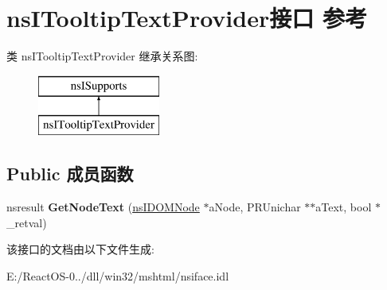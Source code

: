 \hypertarget{interfacens_i_tooltip_text_provider}{}\section{ns\+I\+Tooltip\+Text\+Provider接口 参考}
\label{interfacens_i_tooltip_text_provider}
类 ns\+I\+Tooltip\+Text\+Provider 继承关系图\+:\begin{figure}[H]
\begin{center}
\leavevmode
\includegraphics[height=2.000000cm]{interfacens_i_tooltip_text_provider}
\end{center}
\end{figure}
\subsection*{Public 成员函数}
\begin{DoxyCompactItemize}
\item 
\mbox{\label{interfacens_i_tooltip_text_provider_afdc2d9925b99338655c34c646046e027}} 
nsresult {\bfseries Get\+Node\+Text} (\hyperlink{interfacens_i_d_o_m_node}{ns\+I\+D\+O\+M\+Node} $\ast$a\+Node, P\+R\+Unichar $\ast$$\ast$a\+Text, bool $\ast$\+\_\+retval)
\end{DoxyCompactItemize}


该接口的文档由以下文件生成\+:\begin{DoxyCompactItemize}
\item 
E\+:/\+React\+O\+S-\/0../dll/win32/mshtml/nsiface.\+idl\end{DoxyCompactItemize}
